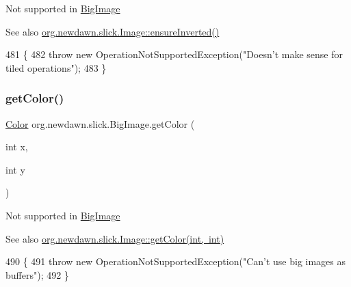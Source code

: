 Not supported in \mbox{\hyperlink{classorg_1_1newdawn_1_1slick_1_1_big_image}{Big\+Image}}

\begin{DoxySeeAlso}{See also}
\mbox{\hyperlink{classorg_1_1newdawn_1_1slick_1_1_image_a7587492a98997703485233d2feed2339}{org.\+newdawn.\+slick.\+Image\+::ensure\+Inverted()}} 
\end{DoxySeeAlso}

\begin{DoxyCode}
481                                  \{
482         \textcolor{keywordflow}{throw} \textcolor{keyword}{new} OperationNotSupportedException(\textcolor{stringliteral}{"Doesn't make sense for tiled operations"});
483     \}
\end{DoxyCode}
\mbox{\label{classorg_1_1newdawn_1_1slick_1_1_big_image_a1890cffdc17cfab2eac623b1b5fd2eed}} 
\subsubsection{\texorpdfstring{get\+Color()}{getColor()}}
{\footnotesize\ttfamily \mbox{\hyperlink{classorg_1_1newdawn_1_1slick_1_1_color}{Color}} org.\+newdawn.\+slick.\+Big\+Image.\+get\+Color (\begin{DoxyParamCaption}\item[{int}]{x,  }\item[{int}]{y }\end{DoxyParamCaption})\hspace{0.3cm}{\ttfamily [inline]}}

Not supported in \mbox{\hyperlink{classorg_1_1newdawn_1_1slick_1_1_big_image}{Big\+Image}}

\begin{DoxySeeAlso}{See also}
\mbox{\hyperlink{classorg_1_1newdawn_1_1slick_1_1_image_ab3b87f64ff6c9c413a7f0a016ba0693c}{org.\+newdawn.\+slick.\+Image\+::get\+Color(int, int)}} 
\end{DoxySeeAlso}

\begin{DoxyCode}
490                                         \{
491         \textcolor{keywordflow}{throw} \textcolor{keyword}{new} OperationNotSupportedException(\textcolor{stringliteral}{"Can't use big images as buffers"});
492     \}
\end{DoxyCode}
\mbox{\label{classorg_1_1newdawn_1_1slick_1_1_big_image_a3c4f3b625f9d079b3676ed1cd8478181}} 

